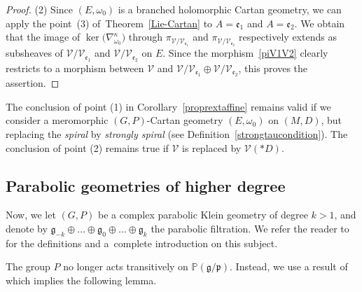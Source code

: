 \documentclass[10pt,a4paper]{amsart}
\numberwithin{equation}{section}
\begin{document}
\begin{proof}
(2) Since $(E,\omega_0)$ is a branched holomorphic Cartan geometry, we can apply the point~(3) of~Theorem~\ref{Lie-Cartan} to $A=\mathfrak{e}_1$ and $A=\mathfrak{e}_2$. We obtain that the image of $\ker\big(\nabla^{\kappa}_{\omega_0}\big)$ through $\pi_{\mathcal{V}/\mathcal{V}_{\mathfrak{e}_1}}$ and $\pi_{\mathcal{V}/\mathcal{V}_{\mathfrak{e}_2}}$ respectively extends as subsheaves of $\mathcal{V}/\mathcal{V}_{\mathfrak{e}_1}$ and $\mathcal{V}/\mathcal{V}_{\mathfrak{e}_2}$ on $E$. Since the morphism~\eqref{piV1V2} clearly restricts to a morphism between $\mathcal{V}$ and $\mathcal{V}/\mathcal{V}_{\mathfrak{e}_1} \oplus \mathcal{V}/\mathcal{V}_{\mathfrak{e}_2}$, this proves the assertion.
\end{proof}

\begin{Remark}\label{remarkmeromorphicproprext} The conclusion of point (1) in Corollary~\ref{proprextaffine} remains valid if we consider a meromorphic $(G,P)$-Cartan geometry $(E,\omega_0)$ on $(M,D)$, but replacing the \textit{spiral} by \textit{strongly spiral} (see Definition~\ref{strongtaucondition}). The conclusion of point (2) remains true if $\mathcal{V}$ is replaced by $\mathcal{V}(* D)$.
\end{Remark}

\subsection{Parabolic geometries of higher degree}
Now, we let $(G,P)$ be a complex parabolic Klein geometry of degree $k>1$, and denote by $\mathfrak{g}_{-k}\oplus \dots \oplus \mathfrak{g}_0 \oplus \dots\oplus \mathfrak{g}_k$ the parabolic filtration. We refer the reader to \cite{Cap} for the definitions and a~complete introduction on this subject.

 The group $P$ no longer acts transitively on $\mathbb{P}(\mathfrak{g}/\mathfrak{p})$. Instead, we use a result of \cite[Theorem, p.~13]{Cap4} which implies the following lemma.
\end{document}
